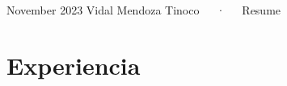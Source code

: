 \documentclass[11pt,a4paper,]{awesome-cv}
\begin{document}
\makecvheader

\makecvfooter
  {November 2023}
    { Vidal Mendoza Tinoco~~~·~~~Resume}
  {\thepage}





\hypertarget{experiencia}{%
\section{Experiencia}\label{experiencia}}
\end{document}
